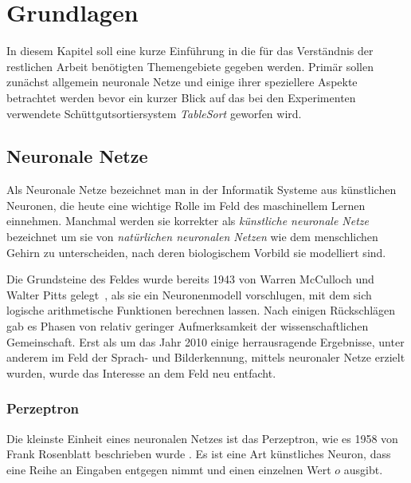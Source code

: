 \chapter{Grundlagen}




In diesem Kapitel soll eine kurze Einführung in die für das Verständnis der restlichen Arbeit benötigten Themengebiete gegeben werden.
Primär sollen zunächst allgemein neuronale Netze und einige ihrer speziellere Aspekte betrachtet werden 
bevor ein kurzer Blick auf das bei den Experimenten verwendete Schüttgutsortiersystem \textit{TableSort} geworfen wird. 

% 

\section{Neuronale Netze}

Als Neuronale Netze  %
bezeichnet man in der Informatik Systeme aus künstlichen Neuronen, die heute eine wichtige Rolle im Feld des maschinellem Lernen einnehmen.
Manchmal werden sie korrekter als \textit{künstliche neuronale Netze} bezeichnet um sie von \textit{natürlichen neuronalen Netzen} 
wie dem menschlichen Gehirn zu unterscheiden, nach deren biologischem Vorbild sie modelliert sind.

Die Grundsteine des Feldes wurde bereits 1943 von Warren McCulloch und Walter Pitts gelegt~\cite{mcculloch1943logical}, 
als sie ein Neuronenmodell vorschlugen, mit dem sich logische arithmetische Funktionen berechnen lassen. 
Nach einigen Rückschlägen gab es Phasen von relativ geringer Aufmerksamkeit der wissenschaftlichen Gemeinschaft. 
Erst als um das Jahr 2010 einige herrausragende Ergebnisse, unter anderem im Feld der Sprach- und Bilderkennung, 
mittels neuronaler Netze erzielt wurden, wurde das Interesse an dem Feld neu entfacht. 



\subsection{Perzeptron}
Die kleinste Einheit eines neuronalen Netzes ist das Perzeptron, wie es 1958 von Frank Rosenblatt beschrieben wurde \cite{rosenblatt1958perceptron}.
Es ist eine Art künstliches Neuron, dass eine Reihe an Eingaben entgegen nimmt und einen einzelnen Wert \(o\) ausgibt.

